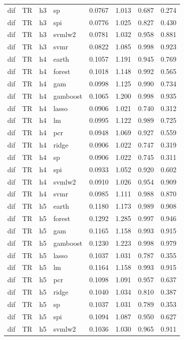\begin{ThreePartTable}
\begin{longtable}[t]{llclcccc}
dif & TR & h3 & sp & 0.0767 & 1.013 & 0.687 & 0.274\\
dif & TR & h3 & spi & 0.0776 & 1.025 & 0.827 & 0.430\\
dif & TR & h3 & svmlw2 & 0.0781 & 1.032 & 0.958 & 0.881\\
dif & TR & h3 & svmr & 0.0822 & 1.085 & 0.998 & 0.923\\
\addlinespace
dif & TR & h4 & earth & 0.1057 & 1.191 & 0.945 & 0.769\\
dif & TR & h4 & forest & 0.1018 & 1.148 & 0.992 & 0.565\\
dif & TR & h4 & gam & 0.0998 & 1.125 & 0.990 & 0.734\\
dif & TR & h4 & gamboost & 0.1065 & 1.200 & 0.998 & 0.935\\
dif & TR & h4 & lasso & 0.0906 & 1.021 & 0.740 & 0.312\\
dif & TR & h4 & lm & 0.0995 & 1.122 & 0.989 & 0.725\\
dif & TR & h4 & pcr & 0.0948 & 1.069 & 0.927 & 0.559\\
dif & TR & h4 & ridge & 0.0906 & 1.022 & 0.747 & 0.319\\
dif & TR & h4 & sp & 0.0906 & 1.022 & 0.745 & 0.311\\
dif & TR & h4 & spi & 0.0933 & 1.052 & 0.920 & 0.602\\
dif & TR & h4 & svmlw2 & 0.0910 & 1.026 & 0.954 & 0.909\\
dif & TR & h4 & svmr & 0.0985 & 1.111 & 0.988 & 0.870\\
\addlinespace
dif & TR & h5 & earth & 0.1180 & 1.173 & 0.989 & 0.908\\
dif & TR & h5 & forest & 0.1292 & 1.285 & 0.997 & 0.946\\
dif & TR & h5 & gam & 0.1165 & 1.158 & 0.993 & 0.915\\
dif & TR & h5 & gamboost & 0.1230 & 1.223 & 0.998 & 0.979\\
dif & TR & h5 & lasso & 0.1037 & 1.031 & 0.787 & 0.355\\
dif & TR & h5 & lm & 0.1164 & 1.158 & 0.993 & 0.915\\
dif & TR & h5 & pcr & 0.1098 & 1.091 & 0.957 & 0.637\\
dif & TR & h5 & ridge & 0.1040 & 1.034 & 0.810 & 0.387\\
dif & TR & h5 & sp & 0.1037 & 1.031 & 0.789 & 0.353\\
dif & TR & h5 & spi & 0.1094 & 1.087 & 0.950 & 0.627\\
dif & TR & h5 & svmlw2 & 0.1036 & 1.030 & 0.965 & 0.911\\

\end{longtable}
\end{ThreePartTable}
